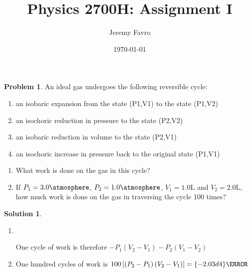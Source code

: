 \documentclass[10pt]{article}
\title{Physics 2700H: Assignment I}
\author{Jeremy Favro}
\date{\today}
\theoremstyle{definition}
\newtheorem{problem}{Problem}
\newtheorem{soln}{Solution}
\begin{document}
\maketitle

\begin{problem}
An ideal gas undergoes the following reversible cycle:

\begin{enumerate}[label=(\roman*)]
  \item an isobaric expansion from the state (P1,V1) to the state (P1,V2)
  \item an isochoric reduction in pressure to the state (P2,V2)
  \item an isobaric reduction in volume to the state (P2,V1)
  \item an isochoric increase in pressure back to the original state (P1,V1)
\end{enumerate}
\begin{enumerate}[label=(\alph*)]
  \item What work is done on the gas in this cycle?
  \item If $P_1 = 3.0\unit{\atmosphere}$, $P_2 = 1.0\unit{\atmosphere}$, $V_1 = 1.0\unit{\liter}$ and $V_2 = 2.0\unit{\liter}$, how much work is done on the gas in traversing the cycle 100 times?
\end{enumerate}
\end{problem}
\begin{soln}~
  \begin{enumerate}[label=(\alph*)]
    \item ~\\
          \begin{center}
          \end{center}
          One cycle of work is therefore $-P_1(V_2-V_1)-P_2(V_1-V_2)$
    \item One hundred cycles of work is $100\left[\left(P_2-P_1\right)(V_2-V_1)\right]=\qty{-2.03d4}{\joule}$
  \end{enumerate}
\end{soln}
\end{document}
